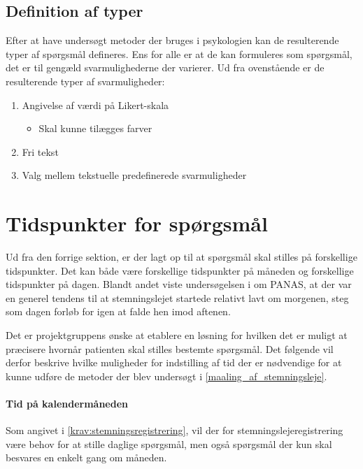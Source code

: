 \subsection{Definition af typer}\label{krav::typer}
Efter at have undersøgt metoder der bruges i psykologien kan de resulterende typer af spørgsmål defineres.
Ens for alle er at de kan formuleres som spørgsmål, det er til gengæld svarmulighederne der varierer.
Ud fra ovenstående er de resulterende typer af svarmuligheder:

\begin{enumerate}
\item Angivelse af værdi på Likert-skala
\begin{itemize}
\item Skal kunne tilægges farver
\end{itemize}
\item Fri tekst
\item Valg mellem tekstuelle predefinerede svarmuligheder
\end{enumerate}

\section{Tidspunkter for spørgsmål}\label{tidspnkforspg}
Ud fra den forrige sektion, er der lagt op til at spørgsmål skal stilles på forskellige tidspunkter.
Det kan både være forskellige tidspunkter på måneden og forskellige tidspunkter på dagen.
Blandt andet viste undersøgelsen i \citet{panas} om PANAS, at der var en generel tendens til at stemningslejet startede relativt lavt om morgenen, steg som dagen forløb for igen at falde hen imod aftenen.

Det er projektgruppens ønske at etablere en løsning for hvilken det er muligt at præcisere hvornår patienten skal stilles bestemte spørgsmål.
Det følgende vil derfor beskrive hvilke muligheder for indstilling af tid der er nødvendige for at kunne udføre de metoder der blev undersøgt i \cref{maaling_af_stemningsleje}.

\paragraph{Tid på kalendermåneden}
Som angivet i \cref{krav:stemningsregistrering}, vil der for stemningslejeregistrering være behov for at stille daglige spørgsmål, men også spørgsmål der kun skal besvares en enkelt gang om måneden.

